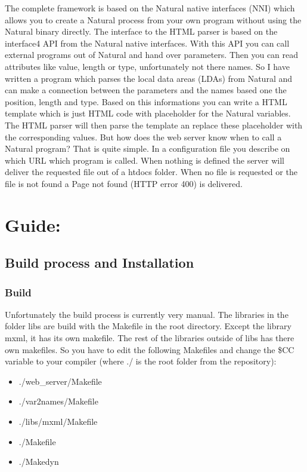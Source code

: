 \documentclass[letterpaper,10pt,english]{sphinxmanual}
\begin{document}
The complete framework is based on the Natural native interfaces (NNI) which allows you to create a Natural process from your own program without using the Natural binary directly. The interface to the HTML parser is based on the interface4 API from the Natural native interfaces. With this API you can call external programs out of Natural and hand over parameters. Then you can read attributes like value, length or type, unfortunately not there names. So I have written a program which parses the local data areas (LDAs) from Natural and can make a connection between the parameters and the names based one the position, length and type. Based on this informations you can write a HTML template which is just HTML code with placeholder for the Natural variables. The HTML parser will then parse the template an replace these placeholder with the corresponding values. But how does the web server know when to call a Natural program? That is quite simple. In a configuration file you describe on which URL which program is called. When nothing is defined the server will deliver the requested file out of a htdocs folder. When no file is requested or the file is not found a \sphinxquotedblleft{}Page not found\sphinxquotedblright{} (HTTP error 400) is delivered.


\chapter{Guide:}
\label{\detokenize{index:guide}}

\section{Build process and Installation}
\label{\detokenize{installation::doc}}\label{\detokenize{installation:build-process-and-installation}}

\subsection{Build}
\label{\detokenize{installation:build}}
Unfortunately the build process is currently very manual.
The libraries in the folder \sphinxquotedblleft{}libs\sphinxquotedblright{} are build with the Makefile in the root directory. Except the library \sphinxquotedblleft{}mxml\sphinxquotedblright{}, it has its own makefile.
The rest of the libraries outside of \sphinxquotedblleft{}libs\sphinxquotedblright{} has there own makefiles.
So you have to edit the following Makefiles and change the \$CC variable to your compiler (where ./ is the root folder from the repository):
\begin{itemize}
\item {} 
./web\_server/Makefile

\item {} 
./var2names/Makefile

\item {} 
./libs/mxml/Makefile

\item {} 
./Makefile

\item {} 
./Makedyn

\end{itemize}
\end{document}
